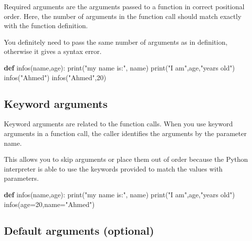 \documentclass[11pt]{article}
\newenvironment{Shaded}{}{}
\newcommand{\KeywordTok}[1]{\textcolor[rgb]{0.00,0.44,0.13}{\textbf{{#1}}}}
\newcommand{\DecValTok}[1]{\textcolor[rgb]{0.25,0.63,0.44}{{#1}}}
\newcommand{\StringTok}[1]{\textcolor[rgb]{0.25,0.44,0.63}{{#1}}}
\newcommand{\NormalTok}[1]{{#1}}
\newcommand{\OperatorTok}[1]{\textcolor[rgb]{0.40,0.40,0.40}{{#1}}}
\newcommand{\BuiltInTok}[1]{{#1}}
\begin{document}
Required arguments are the arguments passed to a function in correct
positional order. Here, the number of arguments in the function call
should match exactly with the function definition.

You definitely need to pass the same number of arguments as in
definition, otherwise it gives a syntax error.

\begin{Shaded}
\begin{Highlighting}[]
\KeywordTok{def}\NormalTok{ infos(name,age):}
        \BuiltInTok{print}\NormalTok{(}\StringTok{"my name is:"}\NormalTok{, name)}
        \BuiltInTok{print}\NormalTok{(}\StringTok{"I am"}\NormalTok{,age,}\StringTok{"years old"}\NormalTok{)}
\NormalTok{    infos(}\StringTok{"Ahmed"}\NormalTok{)}
\NormalTok{    infos(}\StringTok{"Ahmed"}\NormalTok{,}\DecValTok{20}\NormalTok{)}
\end{Highlighting}
\end{Shaded}

\hypertarget{keyword-arguments}{%
\subsection{Keyword arguments}\label{keyword-arguments}}

Keyword arguments are related to the function calls. When you use
keyword arguments in a function call, the caller identifies the
arguments by the parameter name.

This allows you to skip arguments or place them out of order because the
Python interpreter is able to use the keywords provided to match the
values with parameters.

\begin{Shaded}
\begin{Highlighting}[]
\KeywordTok{def}\NormalTok{ infos(name,age):}
        \BuiltInTok{print}\NormalTok{(}\StringTok{"my name is:"}\NormalTok{, name)}
        \BuiltInTok{print}\NormalTok{(}\StringTok{"I am"}\NormalTok{,age,}\StringTok{"years old"}\NormalTok{)}
\NormalTok{    infos(age}\OperatorTok{=}\DecValTok{20}\NormalTok{,name}\OperatorTok{=}\StringTok{"Ahmed"}\NormalTok{)}
\end{Highlighting}
\end{Shaded}

\hypertarget{default-arguments-optional}{%
\subsection{Default arguments
(optional)}\label{default-arguments-optional}}
\end{document}
